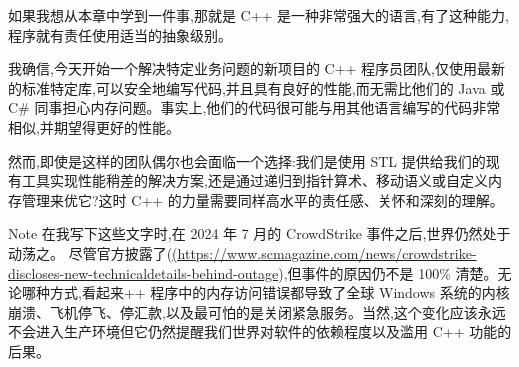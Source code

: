如果我想从本章中学到一件事,那就是 C++ 是一种非常强大的语言,有了这种能力,程序就有责任使用适当的抽象级别。

我确信,今天开始一个解决特定业务问题的新项目的 C++ 程序员团队,仅使用最新的标准特定库,可以安全地编写代码,并且具有良好的性能,而无需比他们的 Java 或 C\# 同事担心内存问题。事实上,他们的代码很可能与用其他语言编写的代码非常相似,并期望得更好的性能。

然而,即使是这样的团队偶尔也会面临一个选择:我们是使用 STL 提供给我们的现有工具实现性能稍差的解决方案,还是通过递归到指针算术、移动语义或自定义内存管理来优它?这时 C++ 的力量需要同样高水平的责任感、关怀和深刻的理解。

\begin{myNotic}{Note}
在我写下这些文字时,在 2024 年 7 月的 CrowdStrike 事件之后,世界仍然处于动荡之。 尽管官方披露了(\url{(https://www.scmagazine.com/news/crowdstrike-discloses-new-technicaldetails-behind-outage}),但事件的原因仍不是 100\% 清楚。无论哪种方式,看起来++ 程序中的内存访问错误都导致了全球 Windows 系统的内核崩溃、飞机停飞、停汇款,以及最可怕的是关闭紧急服务。当然,这个变化应该永远不会进入生产环境但它仍然提醒我们世界对软件的依赖程度以及滥用 C++ 功能的后果。
\end{myNotic}